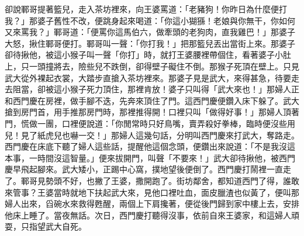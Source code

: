\begin{showcontents}{}
卻說鄆哥提著籃兒，走入茶坊裡來，向王婆罵道：「老豬狗！你昨日為什麼便打我？」那婆子舊性不改，便跳身起來喝道：「你這小猢猻！老娘與你無干，你如何又來罵我？」鄆哥道：「便罵你這馬伯六，做牽頭的老狗肉，直我雞巴！」那婆子大怒，揪住鄆哥便打。鄆哥叫一聲：「你打我！」把那籃兒丟出當街上來。那婆子卻待揪他，被這小猴子叫一聲「你打」時，就打王婆腰裡帶個住，看著婆子小肚上，只一頭撞將去，險些兒不跌倒，卻得壁子礙住不倒。那猴子死頂在壁上。只見武大從外裸起衣裳，大踏步直搶入茶坊裡來。那婆子見是武大，來得甚急，待要走去阻當，卻被這小猴子死力頂住，那裡肯放！婆子只叫得「武大來也！」那婦人正和西門慶在房裡，做手腳不迭，先奔來頂住了門。這西門慶便鑽入床下躲了。武大搶到房門首，用手推那房門時，那裡推得開！口裡只叫「做得好事！」那婦人頂著門，慌做一團，口裡便說道：「你閒常時只好鳥嘴，賣弄殺好拳棒，臨時便沒些用兒！見了紙虎兒也嚇一交！」那婦人這幾句話，分明叫西門慶來打武大，奪路走。西門慶在床底下聽了婦人這些話，提醒他這個念頭，便鑽出來說道：「不是我沒這本事，一時間沒這智量。」便來拔開門，叫聲「不要來！」武大卻待揪他，被西門慶早飛起腳來。武大矮小，正踢中心窩，撲地望後便倒了。西門慶打鬧裡一直走了。鄆哥見勢頭不好，也撇了王婆，撒開跑了。街坊鄰舍，都知道西門了得，誰敢來管事？王婆當時就地下扶起武大來，見他口裡吐血，面皮臘渣也似黃了，便叫那婦人出來，舀碗水來救得甦醒，兩個上下肩攙著，便從後門歸到家中樓上去，安排他床上睡了。當夜無話。次日，西門慶打聽得沒事，依前自來王婆家，和這婦人頑耍，只指望武大自死。


\end{showcontents}
